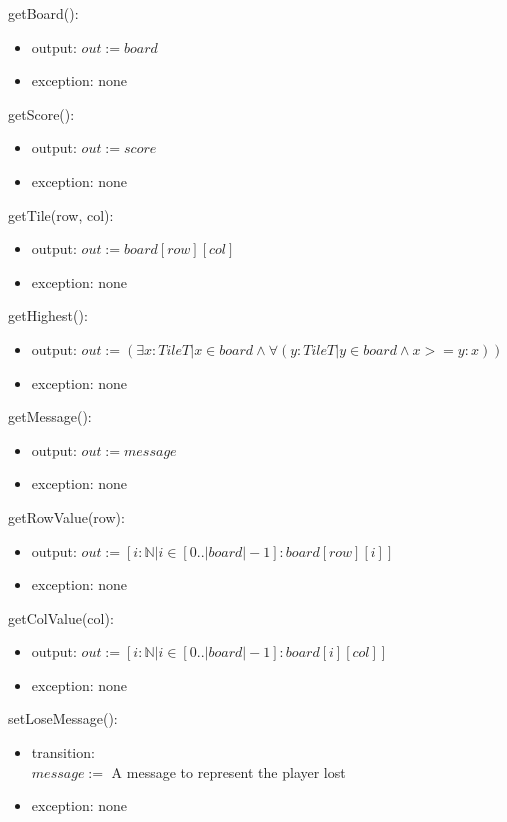 \documentclass[12pt]{article}
\begin{document}
\noindent getBoard():
\begin{itemize}
\item output: $out := board$
\item exception: none
\end{itemize}

\noindent getScore():
\begin{itemize}
\item output: $out := score$
\item exception: none
\end{itemize}

\noindent getTile(row, col):
\begin{itemize}
\item output: $out := board[row][col]$ 
\item exception: none
\end{itemize}

\noindent getHighest():
\begin{itemize}
\item output: $out := (\exists x : TileT | x \in board \land \forall(y : TileT | y \in board \land x >= y : x))$ 
\item exception: none
\end{itemize}

\noindent getMessage():
\begin{itemize}
\item output: $out := message$ 
\item exception: none
\end{itemize}

\noindent getRowValue(row):
\begin{itemize}
\item output: $out := [i : \mathbb{N} | i \in [0.. |board|-1] : board[row][i]]$ 
\item exception: none
\end{itemize}

\noindent getColValue(col):
\begin{itemize}
\item output: $out := [i : \mathbb{N} | i \in [0.. |board|-1] : board[i][col]]$ 
\item exception: none
\end{itemize}

\noindent setLoseMessage():
\begin{itemize}
\item transition:\\ 
$message :=$ A message to represent the player lost
\item exception: none
\end{itemize}
\end{document}
